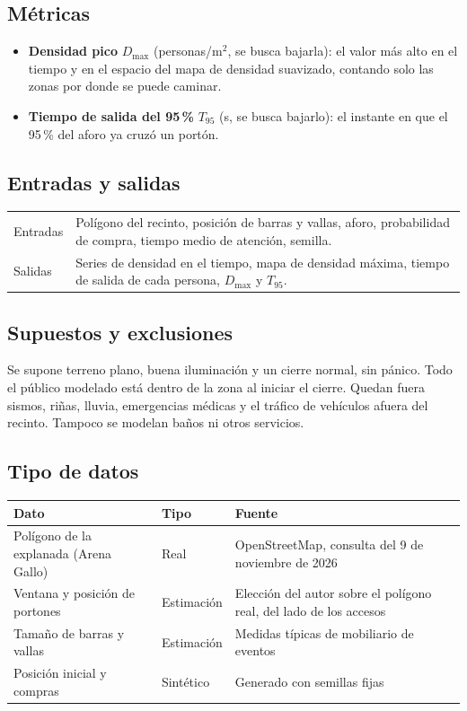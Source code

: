 \documentclass[11pt,letterpaper]{article}
\begin{document}
\subsection{M\'etricas}
\begin{itemize}
\item \textbf{Densidad pico} $D_{\max}$ (personas/m$^2$, se busca bajarla): el valor m\'as alto en el tiempo y en el espacio del mapa de densidad suavizado, contando solo las zonas por donde se puede caminar.
\item \textbf{Tiempo de salida del 95\,\%} $T_{95}$ (s, se busca bajarlo): el instante en que el 95\,\% del aforo ya cruz\'o un port\'on.
\end{itemize}

\subsection{Entradas y salidas}
\begin{table}[H]
\centering
\begin{tabularx}{\textwidth}{lX}
\toprule
Entradas & Pol\'igono del recinto, posici\'on de barras y vallas, aforo, probabilidad de compra, tiempo medio de atenci\'on, semilla. \\
Salidas & Series de densidad en el tiempo, mapa de densidad m\'axima, tiempo de salida de cada persona, $D_{\max}$ y $T_{95}$. \\
\bottomrule
\end{tabularx}
\end{table}

\subsection{Supuestos y exclusiones}
Se supone terreno plano, buena iluminaci\'on y un cierre normal, sin p\'anico. Todo el p\'ublico modelado est\'a dentro de la zona al iniciar el cierre. Quedan fuera sismos, ri\~nas, lluvia, emergencias m\'edicas y el tr\'afico de veh\'iculos afuera del recinto. Tampoco se modelan ba\~nos ni otros servicios.

\subsection{Tipo de datos}
\begin{table}[H]
\centering
\begin{tabularx}{\textwidth}{llX}
\toprule
Dato & Tipo & Fuente \\
\midrule
Pol\'igono de la explanada (Arena Gallo) & Real & OpenStreetMap, consulta del 9 de noviembre de 2026 \\
Ventana y posici\'on de portones & Estimaci\'on & Elecci\'on del autor sobre el pol\'igono real, del lado de los accesos \\
Tama\~no de barras y vallas & Estimaci\'on & Medidas t\'ipicas de mobiliario de eventos \\
Posici\'on inicial y compras & Sint\'etico & Generado con semillas fijas \\
\bottomrule
\end{tabularx}
\end{table}
\end{document}
